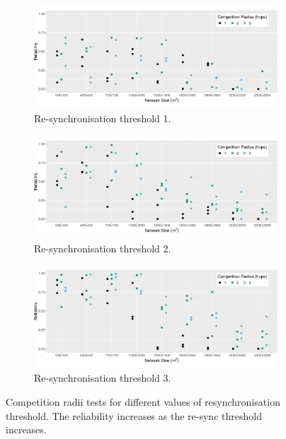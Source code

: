 \newpage
\begin{figure}[H]
\centering
\begin{subfigure}{\textwidth}
    \centering
    \includegraphics[width=\textwidth, keepaspectratio]{figure/Results/ParameterEvaluation/ResyncThreshold1_Reliability.pdf}
    \caption{Re-synchronisation threshold 1.}
    \label{subfig:resync-treshold-1}
\end{subfigure}
\begin{subfigure}{\textwidth}
    \centering
    \includegraphics[width=\textwidth, keepaspectratio]{figure/Results/ParameterEvaluation/ResyncThreshold2_Reliability.pdf}
    \caption{Re-synchronisation threshold 2.}
    \label{subfig:resync-treshold-2}
\end{subfigure}
\begin{subfigure}{\textwidth}
    \centering
    \includegraphics[width=\textwidth, keepaspectratio]{figure/Results/ParameterEvaluation/ResyncThreshold3_Reliability.pdf}
    \caption{Re-synchronisation threshold 3.}
    \label{subfig:resync-treshold-3}
\end{subfigure}

    \caption{Competition radii tests for different values of resynchronisation threshold. The reliability increases as the re-sync threshold increases.}
    \label{fig:resync-treshold-tests}
\end{figure}
\newpage


